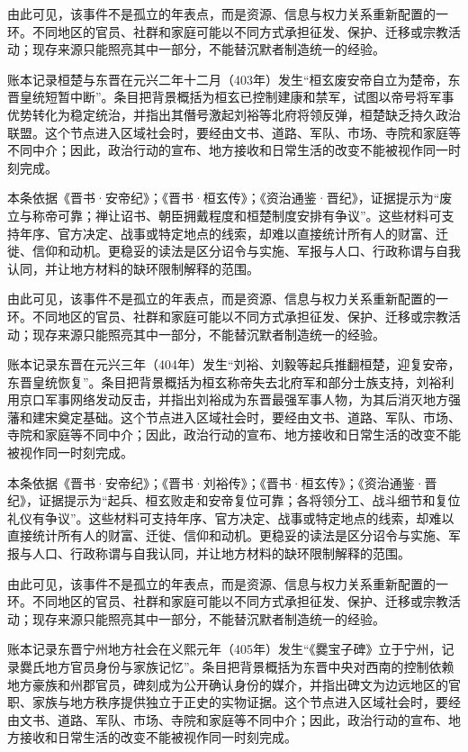 由此可见，该事件不是孤立的年表点，而是资源、信息与权力关系重新配置的一环。不同地区的官员、社群和家庭可能以不同方式承担征发、保护、迁移或宗教活动；现存来源只能照亮其中一部分，不能替沉默者制造统一的经验。

账本记录桓楚与东晋在元兴二年十二月（403年）发生“桓玄废安帝自立为楚帝，东晋皇统短暂中断”。条目把背景概括为桓玄已控制建康和禁军，试图以帝号将军事优势转化为稳定统治，并指出其僭号激起刘裕等北府将领反弹，桓楚缺乏持久政治联盟。这个节点进入区域社会时，要经由文书、道路、军队、市场、寺院和家庭等不同中介；因此，政治行动的宣布、地方接收和日常生活的改变不能被视作同一时刻完成。

本条依据《晋书·安帝纪》；《晋书·桓玄传》；《资治通鉴·晋纪》，证据提示为“废立与称帝可靠；禅让诏书、朝臣拥戴程度和桓楚制度安排有争议”。这些材料可支持年序、官方决定、战事或特定地点的线索，却难以直接统计所有人的财富、迁徙、信仰和动机。更稳妥的读法是区分诏令与实施、军报与人口、行政称谓与自我认同，并让地方材料的缺环限制解释的范围。

由此可见，该事件不是孤立的年表点，而是资源、信息与权力关系重新配置的一环。不同地区的官员、社群和家庭可能以不同方式承担征发、保护、迁移或宗教活动；现存来源只能照亮其中一部分，不能替沉默者制造统一的经验。

账本记录东晋在元兴三年（404年）发生“刘裕、刘毅等起兵推翻桓楚，迎复安帝，东晋皇统恢复”。条目把背景概括为桓玄称帝失去北府军和部分士族支持，刘裕利用京口军事网络发动反击，并指出刘裕成为东晋最强军事人物，为其后消灭地方强藩和建宋奠定基础。这个节点进入区域社会时，要经由文书、道路、军队、市场、寺院和家庭等不同中介；因此，政治行动的宣布、地方接收和日常生活的改变不能被视作同一时刻完成。

本条依据《晋书·安帝纪》；《晋书·刘裕传》；《晋书·桓玄传》；《资治通鉴·晋纪》，证据提示为“起兵、桓玄败走和安帝复位可靠；各将领分工、战斗细节和复位礼仪有争议”。这些材料可支持年序、官方决定、战事或特定地点的线索，却难以直接统计所有人的财富、迁徙、信仰和动机。更稳妥的读法是区分诏令与实施、军报与人口、行政称谓与自我认同，并让地方材料的缺环限制解释的范围。

由此可见，该事件不是孤立的年表点，而是资源、信息与权力关系重新配置的一环。不同地区的官员、社群和家庭可能以不同方式承担征发、保护、迁移或宗教活动；现存来源只能照亮其中一部分，不能替沉默者制造统一的经验。

账本记录东晋宁州地方社会在义熙元年（405年）发生“《爨宝子碑》立于宁州，记录爨氏地方官员身份与家族记忆”。条目把背景概括为东晋中央对西南的控制依赖地方豪族和州郡官员，碑刻成为公开确认身份的媒介，并指出碑文为边远地区的官职、家族与地方秩序提供独立于正史的实物证据。这个节点进入区域社会时，要经由文书、道路、军队、市场、寺院和家庭等不同中介；因此，政治行动的宣布、地方接收和日常生活的改变不能被视作同一时刻完成。

